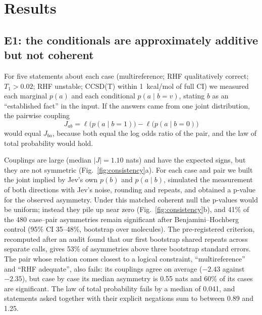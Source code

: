 \documentclass[11pt]{article}
\newcommand{\jev}{Jev}
\begin{document}
\section{Results}

\subsection{E1: the conditionals are approximately additive but not coherent}

For five statements about each case (multireference; RHF qualitatively correct; $T_1>0.02$; RHF unstable; CCSD(T) within 1~kcal/mol of full CI) we measured each marginal $p(a)$ and each conditional $p(a\mid b=v)$, stating $b$ as an ``established fact'' in the input.
If the answers came from one joint distribution, the pairwise coupling
\begin{equation}
J_{ab}=\ell\big(p(a\mid b{=}1)\big)-\ell\big(p(a\mid b{=}0)\big)
\end{equation}
would equal $J_{ba}$, because both equal the log odds ratio of the pair, and the law of total probability would hold.

Couplings are large (median $|J|=1.10$ nats) and have the expected signs, but they are not symmetric (Fig.~\ref{fig:consistency}a).
For each case and pair we built the joint implied by \jev{}'s own $p(b)$ and $p(a\mid b)$, simulated the measurement of both directions with \jev{}'s noise, rounding and repeats, and obtained a p-value for the observed asymmetry.
Under this matched coherent null the p-values would be uniform; instead they pile up near zero (Fig.~\ref{fig:consistency}b), and 41\% of the 480 case--pair asymmetries remain significant after Benjamini--Hochberg control \citep{benjamini1995controlling} (95\% CI 35--48\%, bootstrap over molecules). The pre-registered criterion, recomputed after an audit found that our first bootstrap shared repeats across separate calls, gives 53\% of asymmetries above three bootstrap standard errors.
The pair whose relation comes closest to a logical constraint, ``multireference'' and ``RHF adequate'', also fails: its couplings agree on average ($-2.43$ against $-2.35$), but case by case its median asymmetry is 0.55 nats and 60\% of its cases are significant.
The law of total probability fails by a median of 0.041, and statements asked together with their explicit negations sum to between 0.89 and 1.25.
\end{document}
